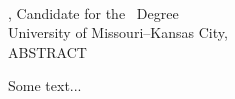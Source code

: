 %
%
\begin{center}
\vspace*{0.01in}
\Large{\MakeUppercase{\MyThesisTitle}}\\
\vspace{24pt}

\normalsize{
  \MyName, Candidate for the \MyDegree\ Degree\\
  University of Missouri--Kansas City, \MyDegreeAwardYear\\
  \vspace{24pt}
  ABSTRACT
  \vspace{24pt}
}

\end{center}

\doublespacing

Some text...

\newpage